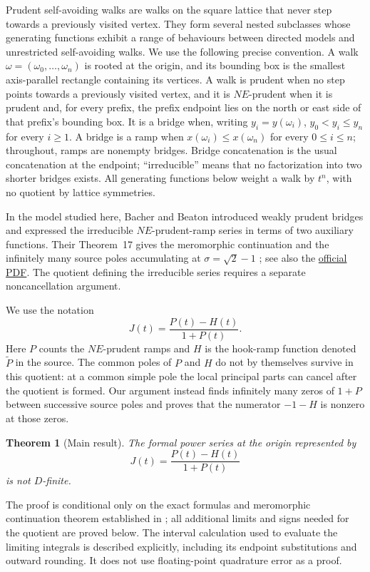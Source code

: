 \documentclass[11pt]{article}
\newtheorem{theorem}{Theorem}[section]
\theoremstyle{definition}
\theoremstyle{remark}
\begin{document}
Prudent self-avoiding walks are walks on the square lattice that never step
towards a previously visited vertex.  They form several nested subclasses
whose generating functions exhibit a range of behaviours between directed
models and unrestricted self-avoiding walks.  We use the following precise
convention.  A walk \(\omega=(\omega_0,\ldots,\omega_n)\) is rooted at the
origin, and its bounding box is the smallest axis-parallel rectangle
containing its vertices.  A walk is prudent when no step points towards a
previously visited vertex, and it is \(NE\)-prudent when it is prudent and,
for every prefix, the prefix endpoint lies on the north or east side of that
prefix's bounding box.  It is a bridge when, writing \(y_i=y(\omega_i)\),
 \(y_0<y_i\leq y_n\) for every \(i\geq1\).  A bridge is a ramp when
\(x(\omega_i)\leq x(\omega_n)\) for every \(0\leq i\leq n\); throughout,
ramps are nonempty bridges.  Bridge
concatenation is the usual concatenation at the endpoint; ``irreducible''
means that no factorization into two shorter bridges exists.  All generating
functions below weight a walk by \(t^{n}\), with no quotient by lattice
symmetries.

In the model studied here, Bacher and Beaton introduced weakly prudent
bridges and expressed the irreducible \(NE\)-prudent-ramp series in terms of
two auxiliary functions.  Their Theorem~17 gives the meromorphic
continuation and the infinitely many source poles accumulating at
\(\sigma=\sqrt2-1\) \cite{BacherBeaton2014}; see also the
\href{https://dmtcs.episciences.org/2445/pdf}{official PDF}.  The quotient
defining the irreducible series requires a separate noncancellation argument.

We use the notation
\[
  J(t)=\frac{P(t)-H(t)}{1+P(t)}.
\]
Here \(P\) counts the \(NE\)-prudent ramps and \(H\) is the hook-ramp
function denoted \(\widetilde P\) in the source.  The common poles of \(P\)
and \(H\) do not by themselves survive in this quotient: at a common simple
pole the local principal parts can cancel after the quotient is formed.
Our argument instead finds infinitely many zeros of \(1+P\) between
successive source poles and proves that the numerator \(-1-H\) is nonzero
at those zeros.

\begin{theorem}[Main result]\label{thm:main}
The formal power series at the origin represented by
\[
  J(t)=\frac{P(t)-H(t)}{1+P(t)}
\]
is not \(D\)-finite.
\end{theorem}

The proof is conditional only on the exact formulas and meromorphic
continuation theorem established in \cite{BacherBeaton2014}; all additional
limits and signs needed for the quotient are proved below.  The interval
calculation used to evaluate the limiting integrals is described explicitly,
including its endpoint substitutions and outward rounding.  It does not use
floating-point quadrature error as a proof.
\end{document}
